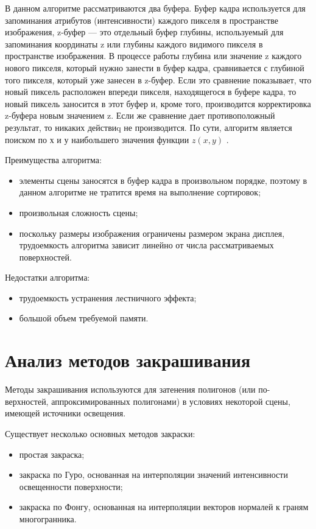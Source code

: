 В данном алгоритме рассматриваются два буфера. Буфер кадра используется для запоминания атрибутов (интенсивности) каждого пикселя в пространстве изображения, z-буфер --- это отдельный буфер глубины, используемый для запоминания координаты z или глубины каждого видимого пикселя в пространстве изображения. В процессе работы глубина или значение z каждого нового пикселя, который нужно занести в буфер кадра, сравнивается с глубиной того пикселя, который уже занесен в z-буфер. Если это сравнение показывает, что новый пиксель расположен впереди пикселя, находящегося в буфере кадра, то новый пиксель заносится в этот буфер и, кроме того, производится корректировка z-буфера новым значением z. Если же сравнение дает противоположный результат, то никаких действиq не производится. По сути, алгоритм является поиском по х и у наибольшего значения функции $z(x, y)$ \cite{demin}.

Преимущества алгоритма:
\begin{itemize}
	\item элементы сцены заносятся в буфер кадра в произвольном порядке, поэтому в данном алгоритме не тратится время на выполнение сортировок;
	\item произвольная сложность сцены;
	\item поскольку размеры изображения ограничены размером экрана дисплея, трудоемкость алгоритма зависит линейно от числа рассматриваемых поверхностей.
\end{itemize}

Недостатки алгоритма:
\begin{itemize}
	\item трудоемкость устранения лестничного эффекта;
	\item большой объем требуемой памяти.
\end{itemize}


\section{Анализ методов закрашивания}

Методы закрашивания используются для затенения полигонов (или по-
верхностей, аппроксимированных полигонами) в условиях некоторой сцены, имеющей источники освещения.

Существует несколько основных методов закраски:
\begin{itemize}
	\item простая закраска;
	\item закраска по Гуро, основанная на интерполяции значений интенсивности освещенности поверхности;
	\item закраска по Фонгу, основанная на интерполяции векторов нормалей к граням многогранника.
\end{itemize}

